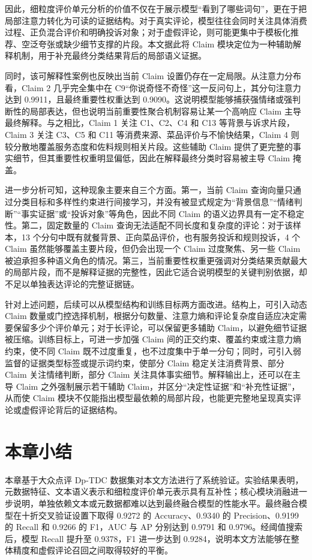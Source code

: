 \documentclass[UTF8,oneside,openright,fontset=none]{ctexbook}
\numberwithin{equation}{chapter}
\begin{document}
因此，细粒度评价单元分析的价值不仅在于展示模型“看到了哪些词句”，更在于把局部注意力转化为可读的证据结构。对于真实评论，模型往往会同时关注具体消费过程、正负混合评价和明确投诉对象；对于虚假评论，则可能更集中于模板化推荐、空泛夸张或缺少细节支撑的片段。本文据此将 Claim 模块定位为一种辅助解释机制，用于补充最终分类结果背后的局部语义证据。

同时，该可解释性案例也反映出当前 Claim 设置仍存在一定局限。从注意力分布看，Claim 2 几乎完全集中在 C9“你说奇怪不奇怪”这一反问句上，其分句注意力达到 0.9911，且最终重要性权重达到 0.9090。这说明模型能够捕获强情绪或强判断性的局部表达，但也说明当前重要性聚合机制容易让某一个高响应 Claim 主导最终解释。与之相比，Claim 1 关注 C1、C2、C4 和 C13 等背景与诉求片段，Claim 3 关注 C3、C5 和 C11 等消费来源、菜品评价与不愉快结果，Claim 4 则较分散地覆盖服务态度和佐料规则相关片段。这些辅助 Claim 提供了更完整的事实细节，但其重要性权重明显偏低，因此在解释最终分类时容易被主导 Claim 掩盖。

进一步分析可知，这种现象主要来自三个方面。第一，当前 Claim 查询向量只通过分类目标和多样性约束进行间接学习，并没有被显式规定为“背景信息”“情绪判断”“事实证据”或“投诉对象”等角色，因此不同 Claim 的语义边界具有一定不稳定性。第二，固定数量的 Claim 查询无法适配不同长度和复杂度的评论：对于该样本，13 个分句中既有就餐背景、正向菜品评价，也有服务投诉和规则投诉，4 个 Claim 虽然能够覆盖主要片段，但仍会出现一个 Claim 过度聚焦、另一些 Claim 被迫承担多种语义角色的情况。第三，当前重要性权重更强调对分类结果贡献最大的局部片段，而不是解释证据的完整性，因此它适合说明模型的关键判别依据，却不足以单独表达评论的完整证据链。

针对上述问题，后续可以从模型结构和训练目标两方面改进。结构上，可引入动态 Claim 数量或门控选择机制，根据分句数量、注意力熵和评论复杂度自适应决定需要保留多少个评价单元；对于长评论，可以保留更多辅助 Claim，以避免细节证据被压缩。训练目标上，可进一步加强 Claim 间的正交约束、覆盖约束或注意力熵约束，使不同 Claim 既不过度重复，也不过度集中于单一分句；同时，可引入弱监督的证据类型标签或提示词约束，使部分 Claim 稳定关注消费背景、部分 Claim 关注情绪判断，部分 Claim 关注具体事实细节。解释输出上，还可以在主导 Claim 之外强制展示若干辅助 Claim，并区分“决定性证据”和“补充性证据”，从而使 Claim 模块不仅能指出模型最依赖的局部片段，也能更完整地呈现真实评论或虚假评论背后的证据结构。

\section{本章小结}
本章基于大众点评 Dp-TDC 数据集对本文方法进行了系统验证。实验结果表明，元数据特征、文本语义表示和细粒度评价单元表示具有互补性；核心模块消融进一步说明，单独依赖文本或元数据都难以达到最终融合模型的性能水平。最终融合模型在十折交叉验证设置下取得 0.9272 的 Accuracy、0.9340 的 Precision、0.9199 的 Recall 和 0.9266 的 F1，AUC 与 AP 分别达到 0.9791 和 0.9796。经阈值搜索后，模型 Recall 提升至 0.9378，F1 进一步达到 0.9284，说明本文方法能够在整体精度和虚假评论召回之间取得较好的平衡。
\end{document}
